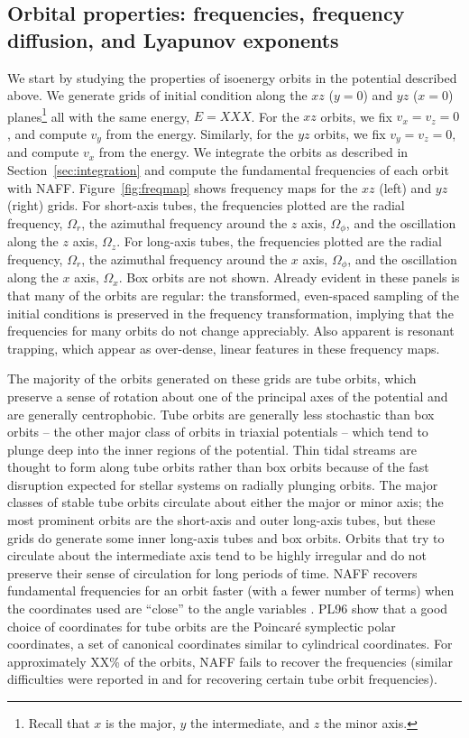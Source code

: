 \documentclass[letterpaper,12pt,preprint]{aastex}
\begin{document}
\subsection{Orbital properties: frequencies, frequency diffusion, and Lyapunov exponents}

We start by studying the properties of isoenergy orbits in the potential described above. We generate grids of initial condition along the $xz$ ($y=0$) and $yz$ ($x=0$) planes\footnote{Recall that $x$ is the major, $y$ the intermediate, and $z$ the minor axis.} all with the same energy, $E=XXX$. For the $xz$ orbits, we fix $v_x = v_z = 0$, and compute $v_y$ from the energy. Similarly, for the $yz$ orbits, we fix $v_y = v_z = 0$, and compute $v_x$ from the energy. We integrate the orbits as described in Section~\ref{sec:integration} and compute the fundamental frequencies of each orbit with NAFF. Figure~\ref{fig:freqmap} shows frequency maps for the $xz$ (left) and $yz$ (right) grids. For short-axis tubes, the frequencies plotted are the radial frequency, $\Omega_r$, the azimuthal frequency around the $z$ axis, $\Omega_\phi$, and the oscillation along the $z$ axis, $\Omega_z$. For long-axis tubes, the frequencies plotted are the radial frequency, $\Omega_r$, the azimuthal frequency around the $x$ axis, $\Omega_\phi$, and the oscillation along the $x$ axis, $\Omega_x$. Box orbits are not shown. Already evident in these panels is that many of the orbits are regular: the transformed, even-spaced sampling of the initial conditions is preserved in the frequency transformation, implying that the frequencies for many orbits do not change appreciably. Also apparent is resonant trapping,  which appear as over-dense, linear features in these frequency maps. 

The majority of the orbits generated on these grids are tube orbits, which preserve a sense of rotation about one of the principal axes of the potential and are generally centrophobic. Tube orbits are generally less stochastic than box orbits -- the other major class of orbits in triaxial potentials -- which tend to plunge deep into the inner regions of the potential. Thin tidal streams are thought to form along tube orbits rather than box orbits because of the fast disruption expected for stellar systems on radially plunging orbits. The major classes of stable tube orbits circulate about either the major or minor axis; the most prominent orbits are the short-axis and outer long-axis tubes, but these grids do generate some inner long-axis tubes and box orbits. Orbits that try to circulate about the intermediate axis tend to be highly irregular and do not preserve their sense of circulation for long periods of time. NAFF recovers fundamental frequencies for an orbit faster (with a fewer number of terms) when the coordinates used are ``close'' to the angle variables \cite[PL96][]{papaphilippou96}. PL96 show that a good choice of coordinates for tube orbits are the Poincar\'e symplectic polar coordinates, a set of canonical coordinates similar to cylindrical coordinates. For approximately XX\% of the orbits, NAFF fails to recover the frequencies (similar difficulties were reported in \cite{valluri98} and \cite{papaphilippou96} for recovering certain tube orbit frequencies).
\end{document}
